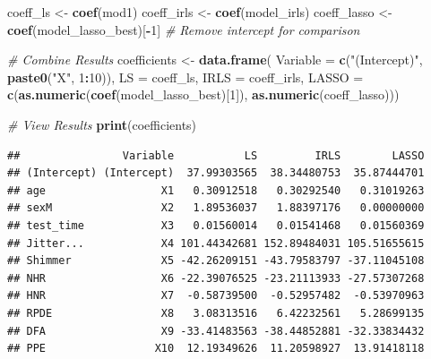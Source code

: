 \documentclass[
]{article}
\newenvironment{Shaded}{\begin{snugshade}}{\end{snugshade}}
\newcommand{\AttributeTok}[1]{\textcolor[rgb]{0.13,0.29,0.53}{#1}}
\newcommand{\CommentTok}[1]{\textcolor[rgb]{0.56,0.35,0.01}{\textit{#1}}}
\newcommand{\DecValTok}[1]{\textcolor[rgb]{0.00,0.00,0.81}{#1}}
\newcommand{\FunctionTok}[1]{\textcolor[rgb]{0.13,0.29,0.53}{\textbf{#1}}}
\newcommand{\NormalTok}[1]{#1}
\newcommand{\OtherTok}[1]{\textcolor[rgb]{0.56,0.35,0.01}{#1}}
\newcommand{\SpecialCharTok}[1]{\textcolor[rgb]{0.81,0.36,0.00}{\textbf{#1}}}
\newcommand{\StringTok}[1]{\textcolor[rgb]{0.31,0.60,0.02}{#1}}
\begin{document}
\begin{Shaded}
\begin{Highlighting}[]
\NormalTok{coeff\_ls }\OtherTok{\textless{}{-}} \FunctionTok{coef}\NormalTok{(mod1)}
\NormalTok{coeff\_irls }\OtherTok{\textless{}{-}} \FunctionTok{coef}\NormalTok{(model\_irls)}
\NormalTok{coeff\_lasso }\OtherTok{\textless{}{-}} \FunctionTok{coef}\NormalTok{(model\_lasso\_best)[}\SpecialCharTok{{-}}\DecValTok{1}\NormalTok{]  }\CommentTok{\# Remove intercept for comparison}

\CommentTok{\# Combine Results}
\NormalTok{coefficients }\OtherTok{\textless{}{-}} \FunctionTok{data.frame}\NormalTok{(}
  \AttributeTok{Variable =} \FunctionTok{c}\NormalTok{(}\StringTok{"(Intercept)"}\NormalTok{, }\FunctionTok{paste0}\NormalTok{(}\StringTok{"X"}\NormalTok{, }\DecValTok{1}\SpecialCharTok{:}\DecValTok{10}\NormalTok{)),}
  \AttributeTok{LS =}\NormalTok{ coeff\_ls,}
  \AttributeTok{IRLS =}\NormalTok{ coeff\_irls,}
  \AttributeTok{LASSO =} \FunctionTok{c}\NormalTok{(}\FunctionTok{as.numeric}\NormalTok{(}\FunctionTok{coef}\NormalTok{(model\_lasso\_best)[}\DecValTok{1}\NormalTok{]), }\FunctionTok{as.numeric}\NormalTok{(coeff\_lasso)))}

\CommentTok{\# View Results}
\FunctionTok{print}\NormalTok{(coefficients)}
\end{Highlighting}
\end{Shaded}

\begin{verbatim}
##                Variable           LS         IRLS        LASSO
## (Intercept) (Intercept)  37.99303565  38.34480753  35.87444701
## age                  X1   0.30912518   0.30292540   0.31019263
## sexM                 X2   1.89536037   1.88397176   0.00000000
## test_time            X3   0.01560014   0.01541468   0.01560369
## Jitter...            X4 101.44342681 152.89484031 105.51655615
## Shimmer              X5 -42.26209151 -43.79583797 -37.11045108
## NHR                  X6 -22.39076525 -23.21113933 -27.57307268
## HNR                  X7  -0.58739500  -0.52957482  -0.53970963
## RPDE                 X8   3.08313516   6.42232561   5.28699135
## DFA                  X9 -33.41483563 -38.44852881 -32.33834432
## PPE                 X10  12.19349626  11.20598927  13.91418118
\end{verbatim}
\end{document}
